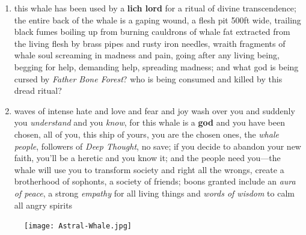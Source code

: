 \documentclass[11pt]{bxart}
\begin{document}
\begin{enumerate}
\item this whale has been used by a \textbf{lich lord} for a ritual of divine transcendence; the entire back of the whale is a gaping wound, a flesh pit 500ft wide, trailing black fumes boiling up from burning cauldrons of whale fat extracted from the living flesh by brass pipes and rusty iron needles, wraith fragments of whale soul screaming in madness and pain, going after any living being, begging for help, demanding help, spreading madness; and what god is being cursed by \textit{Father Bone Forest}? who is being consumed and killed by this dread ritual?

\item waves of intense hate and love and fear and joy wash over you and suddenly you \textit{understand} and you \textit{know}, for this whale is a \textbf{god} and you have been chosen, all of you, this ship of yours, you are the chosen ones, the \textit{whale people}, followers of \textit{Deep Thought}, no save; if you decide to abandon your new faith, you'll be a heretic and you know it; and the people need you—the whale will use you to transform society and right all the wrongs, create a brotherhood of sophonts, a society of friends; boons granted include an \textit{aura of peace}, a strong \textit{empathy} for all living things and \textit{words of wisdom} to calm all angry spirits
\end{enumerate}

\begin{figure}[h]
  \centering
  \texttt{[image: Astral-Whale.jpg]}
\end{figure}
\end{document}
